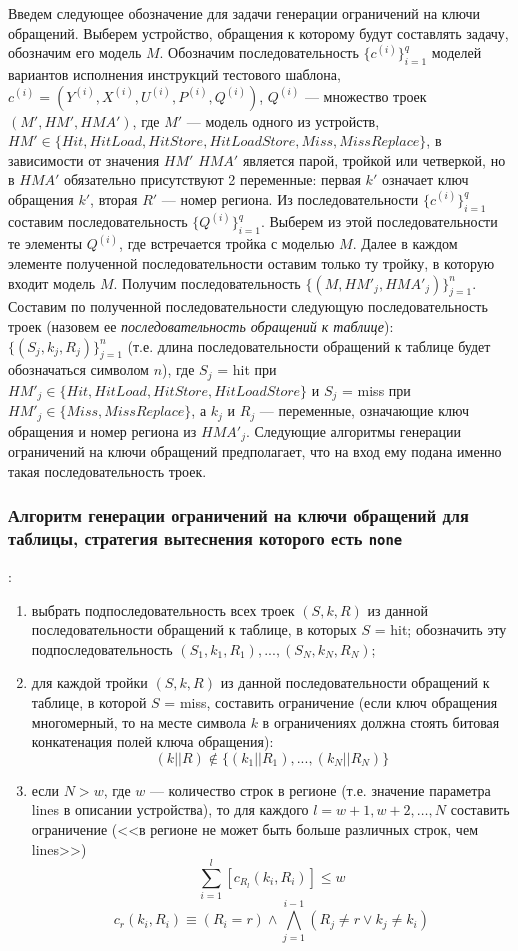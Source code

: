 Введем следующее обозначение для задачи генерации ограничений на ключи обращений. Выберем устройство, обращения к которому будут составлять задачу, обозначим его модель $M$. Обозначим  последовательность $\{c^{(i)}\}_{i=1}^q$ моделей вариантов исполнения инструкций тестового шаблона, $c^{(i)} = (Y^{(i)}, X^{(i)}, U^{(i)}, P^{(i)}, Q^{(i)})$, $Q^{(i)}$ --- множество троек $(M', HM', HMA')$, где $M'$ --- модель одного из устройств, $HM' \in \{Hit, HitLoad, HitStore, HitLoadStore, Miss, MissReplace\}$, в зависимости от значения $HM'$ $HMA'$ является парой, тройкой или четверкой, но в $HMA'$ обязательно присутствуют 2 переменные: первая $k'$ означает ключ обращения $k'$, вторая $R'$ --- номер региона. Из последовательности $\{c^{(i)}\}_{i=1}^q$ составим последовательность $\{Q^{(i)}\}_{i=1}^q$. Выберем из этой последовательности те элементы $Q^{(i)}$, где встречается тройка с моделью $M$. Далее в каждом элементе полученной последовательности оставим только ту тройку, в которую входит модель $M$. Получим последовательность $\{(M, HM'_j, HMA'_j)\}_{j=1}^n$. Составим по полученной последовательности следующую последовательность троек (назовем ее \emph{последовательность обращений к таблице}): $\{(S_j, k_j, R_j)\}_{j=1}^n$ (т.е. длина последовательности обращений к таблице будет обозначаться символом $n$), где $S_j$ = hit при $HM'_j \in \{Hit, HitLoad, HitStore, HitLoadStore\}$ и $S_j$ = miss при $HM'_j \in \{Miss, MissReplace\}$, а $k_j$ и $R_j$ --- переменные, означающие ключ обращения и номер региона из $HMA'_j$. Следующие алгоритмы генерации ограничений на ключи обращений предполагает, что на вход ему подана именно такая последовательность троек.

\subsubsection*{Алгоритм генерации ограничений на ключи обращений для таблицы, стратегия вытеснения которого есть \texttt{none}}:

\begin{enumerate}
    \item выбрать подпоследовательность всех троек $(S, k, R)$ из данной последовательности обращений к таблице, в которых $S$ = hit; обозначить эту подпоследовательность $(S_1, k_1, R_1), ..., (S_N, k_N, R_N)$;
    \item для каждой тройки $(S, k, R)$ из данной последовательности обращений к таблице, в которой $S$ = miss, составить ограничение (если ключ обращения многомерный, то на месте символа $k$ в ограничениях должна стоять битовая конкатенация полей ключа обращения): $$(k||R) \notin \{(k_1||R_1), ..., (k_N||R_N)\}$$
    \item если $N > w$, где $w$ --- количество строк в регионе (т.е. значение параметра lines в описании устройства), то для каждого $l = w+1, w+2, \dots, N$ составить ограничение (<<в регионе не может быть больше различных строк, чем lines>>)
$$\sum_{i=1}^l [c_{R_l} (k_i, R_i)] \leqslant w$$
$$c_r (k_i, R_i) \equiv (R_i = r) \wedge \bigwedge_{j=1}^{i-1} (R_j \neq r \vee k_j \neq k_i)$$
\end{enumerate}

